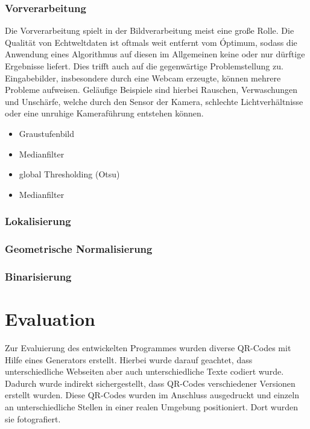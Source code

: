 \documentclass[a4paper, oneside, 12pt]{article}
\begin{document}
\subsubsection{Vorverarbeitung}
Die Vorverarbeitung spielt in der Bildverarbeitung meist eine große Rolle. Die Qualität von Echtweltdaten ist oftmals weit entfernt vom Óptimum, sodass die Anwendung eines Algorithmus auf diesen im Allgemeinen keine oder nur dürftige Ergebnisse liefert.
Dies trifft auch auf die gegenwärtige Problemstellung zu. Eingabebilder, insbesondere durch eine Webcam erzeugte, können mehrere Probleme aufweisen.
Geläufige Beispiele sind hierbei Rauschen, Verwaschungen und Unschärfe, welche durch den Sensor der Kamera, schlechte Lichtverhältnisse oder eine unruhige Kameraführung entstehen können.

\begin{itemize}
	\item Graustufenbild
	\item Medianfilter
	\item global Thresholding (Otsu)
	\item Medianfilter
\end{itemize}

\subsubsection{Lokalisierung}

\subsubsection{Geometrische Normalisierung}

\subsubsection{Binarisierung}

\newpage
\section{Evaluation}
Zur Evaluierung des entwickelten Programmes wurden diverse QR-Codes mit Hilfe eines Generators erstellt. Hierbei wurde darauf geachtet, dass unterschiedliche Webseiten aber auch unterschiedliche Texte codiert wurde. Dadurch wurde indirekt sichergestellt, dass QR-Codes verschiedener Versionen erstellt wurden. Diese QR-Codes wurden im Anschluss ausgedruckt und einzeln an unterschiedliche Stellen in einer realen Umgebung positioniert. Dort wurden sie fotografiert. 
\end{document}
